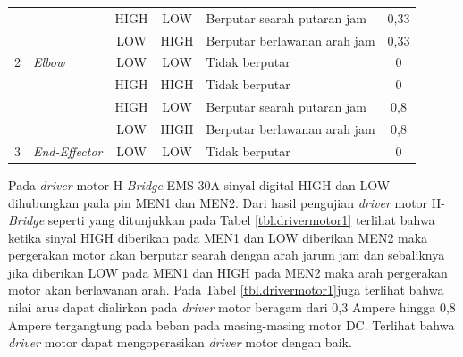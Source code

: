 \begin{longtable}{|c|l|c|c|l|c|}
	&                                                                      & HIGH                         & LOW                          & Berputar searah putaran jam                                            & 0,33                                                \\ \cline{3-6} 
	&                                                                      & LOW                          & HIGH                         & Berputar berlawanan arah jam                                           & 0,33                                                \\ \cline{3-6} 
	\multirow{-4}{*}{2}                          & \multirow{-4}{*}{\textit{Elbow}}                                              & LOW                          & LOW                          & Tidak berputar                                                         & 0                                                   \\ \hline
	&                                                                      & HIGH                         & HIGH                         & Tidak berputar                                                         & 0                                                   \\ \cline{3-6} 
	&                                                                      & HIGH                         & LOW                          & Berputar searah putaran jam                                            & 0,8                                                 \\ \cline{3-6} 
	&                                                                      & LOW                          & HIGH                         & Berputar berlawanan arah jam                                           & 0,8                                                 \\ \cline{3-6} 
	\multirow{-4}{*}{3}                          & \multirow{-4}{*}{\textit{End-Effector}}                                       & LOW                          & LOW                          & Tidak berputar                                                         & 0                                                   \\ \hline
\end{longtable}
Pada \textit{driver} motor H-\textit{Bridge} EMS 30A sinyal digital HIGH dan LOW dihubungkan pada pin MEN1 dan MEN2. Dari hasil pengujian \textit{driver} motor H-\textit{Bridge} seperti yang ditunjukkan pada Tabel \ref{tbl.drivermotor1} terlihat bahwa ketika sinyal HIGH diberikan pada MEN1 dan LOW diberikan MEN2 maka pergerakan motor akan berputar searah dengan arah jarum jam dan sebaliknya jika diberikan LOW pada MEN1 dan HIGH pada MEN2 maka arah pergerakan motor akan berlawanan arah. Pada Tabel \ref{tbl.drivermotor1}juga terlihat bahwa nilai arus dapat dialirkan pada \textit{driver} motor beragam dari 0,3 Ampere hingga 0,8 Ampere tergangtung pada beban pada masing-masing motor DC. Terlihat bahwa \textit{driver} motor dapat mengoperasikan \textit{driver} motor dengan baik.


